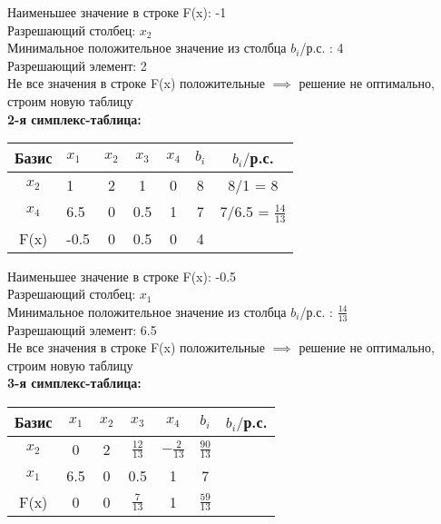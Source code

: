 \begin{flushleft}
    Наименьшее значение в строке F(x): -1\\
    Разрешающий столбец: $x_2$\\
    Минимальное положительное значение из столбца $b_i$/р.с. : 4\\
    Разрешающий элемент: 2\\
    Не все значения в строке F(x) положительные $\implies$ решение не оптимально, строим новую таблицу\\
    {\bf2-я симплекс-таблица:}\\
\end{flushleft}

\begin{center}
    \begin{tabular}{|c | g c c c c c|} 
         \hline
            Базис & $x_1$ & $x_2$ & $x_3$ & $x_4$ & $b_i$ & $b_i/$р.с.\\
         \hline
            $x_2$ & 1 & 2 & 1 & 0 & 8 & 8/1 = 8\\
         \hline
            $x_4$ & 6.5 & 0 & 0.5 & 1 & 7 & 7/6.5 = $\frac{14}{13}$\\
         \hline
            F(x) & -0.5 & 0 & 0.5 & 0 & 4 &\\
         \hline
    \end{tabular}
\end{center}

\begin{flushleft}
    Наименьшее значение в строке F(x): -0.5\\
    Разрешающий столбец: $x_1$\\
    Минимальное положительное значение из столбца $b_i$/р.с. : $\frac{14}{13}$\\
    Разрешающий элемент: 6.5\\
    Не все значения в строке F(x) положительные $\implies$ решение не оптимально, строим новую таблицу\\
    {\bf3-я симплекс-таблица:}
\end{flushleft}

\begin{center}
    \begin{tabular}{|c | c c c c c c|} 
         \hline
            Базис & $x_1$ & $x_2$ & $x_3$ & $x_4$ & $b_i$ & $b_i/$р.с.\\
         \hline
            $x_2$ & 0 & 2 & $\frac{12}{13}$ & $-\frac{2}{13}$ & $\frac{90}{13}$ & \\
         \hline
            $x_1$ & 6.5 & 0 & 0.5 & 1 & 7 &\\
         \hline
            F(x) & 0 & 0 & $\frac{7}{13}$ & 1 & $\frac{59}{13}$ &\\
         \hline
    \end{tabular}
\end{center}

